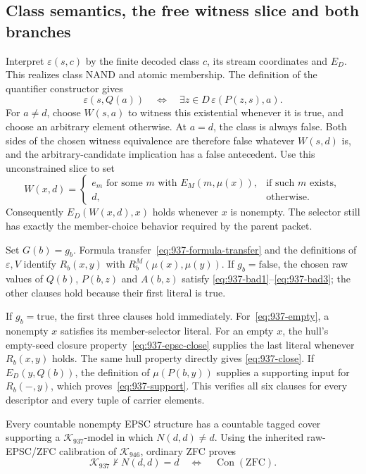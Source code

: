 \subsection{Class semantics, the free witness slice and both branches}

Interpret \(\varepsilon(s,c)\) by the finite decoded class \(c\),
its stream coordinates and \(E_D\).  This realizes class NAND and
atomic membership.  The definition of the quantifier constructor
gives
\[
 \varepsilon(s,Q(a))
       \quad\Longleftrightarrow\quad
       \exists z\in D\,\varepsilon(P(z,s),a).
\]
For \(a\ne d\), choose \(W(s,a)\) to witness this existential
whenever it is true, and choose an arbitrary element otherwise.
At \(a=d\), the class is always false.  Both sides of the chosen
witness equivalence are therefore false whatever \(W(s,d)\) is,
and the arbitrary-candidate implication has a false antecedent.
Use this unconstrained slice to set
\[
 W(x,d)=
 \begin{cases}
   e_m \text{ for some }m\text{ with }E_M(m,\mu(x)),
                      &\text{if such }m\text{ exists},\\
   d,                  &\text{otherwise}.
 \end{cases}
\]
Consequently \(E_D(W(x,d),x)\) holds whenever \(x\) is nonempty.
The selector still has exactly the member-choice behavior required
by the parent packet.

Set \(G(b)=g_b\).  Formula transfer~\eqref{eq:937-formula-transfer}
and the definitions of \(\varepsilon,V\) identify \(R_b(x,y)\)
with \(R_b^M(\mu(x),\mu(y))\).
If \(g_b=\mathrm{false}\), the chosen raw values of \(Q(b)\),
\(P(b,z)\) and \(A(b,z)\) satisfy
\eqref{eq:937-bad1}--\eqref{eq:937-bad3}; the other clauses
hold because their first literal is true.

If \(g_b=\mathrm{true}\), the first three clauses hold immediately.
For~\eqref{eq:937-empty}, a nonempty \(x\) satisfies its member-selector
literal.  For an empty \(x\), the hull's empty-seed closure
property~\eqref{eq:937-epsc-close} supplies the last literal whenever
\(R_b(x,y)\) holds.  The same hull property directly gives
\eqref{eq:937-close}.  If \(E_D(y,Q(b))\), the definition of
\(\mu(P(b,y))\) supplies a supporting input for \(R_b(-,y)\),
which proves~\eqref{eq:937-support}.
This verifies all six clauses for every descriptor and every tuple
of carrier elements.

\begin{theorem}
\label{thm:937-calibration}
Every countable nonempty EPSC structure has a countable tagged cover
supporting a \(\mathcal K_{937}\)-model in which \(N(d,d)\ne d\).
Using the inherited raw-EPSC/ZFC calibration of
\(\mathcal K_{946}\), ordinary ZFC proves
\[
       \mathcal K_{937}\nvdash N(d,d)=d
                \quad\Longleftrightarrow\quad
       \operatorname{Con}(\mathrm{ZFC}).
\]
\end{theorem}

